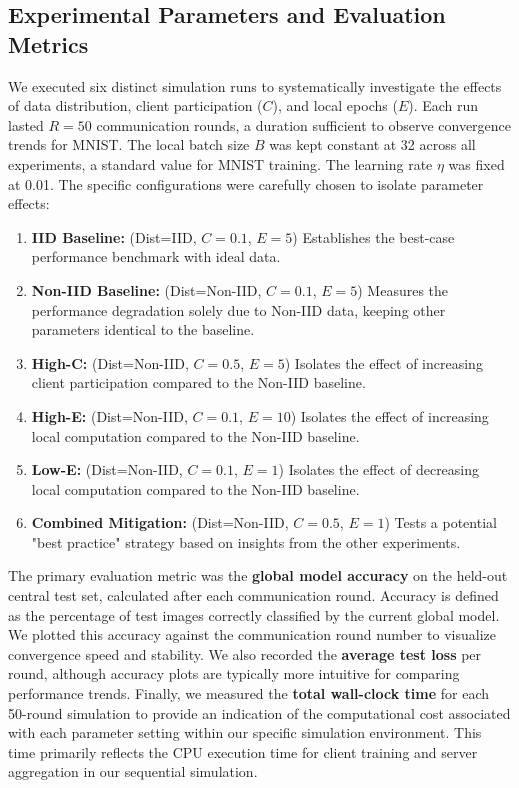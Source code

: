\documentclass[conference]{IEEEtran}
\begin{document}
\subsection{Experimental Parameters and Evaluation Metrics}
We executed six distinct simulation runs to systematically investigate the effects of data distribution, client participation ($C$), and local epochs ($E$). Each run lasted $R=50$ communication rounds, a duration sufficient to observe convergence trends for MNIST. The local batch size $B$ was kept constant at 32 across all experiments, a standard value for MNIST training. The learning rate $\eta$ was fixed at 0.01. The specific configurations were carefully chosen to isolate parameter effects:
\begin{enumerate}
    \item \textbf{IID Baseline:} (Dist=IID, $C=0.1$, $E=5$) Establishes the best-case performance benchmark with ideal data.
    \item \textbf{Non-IID Baseline:} (Dist=Non-IID, $C=0.1$, $E=5$) Measures the performance degradation solely due to Non-IID data, keeping other parameters identical to the baseline.
    \item \textbf{High-C:} (Dist=Non-IID, $C=0.5$, $E=5$) Isolates the effect of increasing client participation compared to the Non-IID baseline.
    \item \textbf{High-E:} (Dist=Non-IID, $C=0.1$, $E=10$) Isolates the effect of increasing local computation compared to the Non-IID baseline.
    \item \textbf{Low-E:} (Dist=Non-IID, $C=0.1$, $E=1$) Isolates the effect of decreasing local computation compared to the Non-IID baseline.
    \item \textbf{Combined Mitigation:} (Dist=Non-IID, $C=0.5$, $E=1$) Tests a potential "best practice" strategy based on insights from the other experiments.
\end{enumerate}
The primary evaluation metric was the \textbf{global model accuracy} on the held-out central test set, calculated after each communication round. Accuracy is defined as the percentage of test images correctly classified by the current global model. We plotted this accuracy against the communication round number to visualize convergence speed and stability. We also recorded the \textbf{average test loss} per round, although accuracy plots are typically more intuitive for comparing performance trends. Finally, we measured the \textbf{total wall-clock time} for each 50-round simulation to provide an indication of the computational cost associated with each parameter setting within our specific simulation environment. This time primarily reflects the CPU execution time for client training and server aggregation in our sequential simulation.
\end{document}
